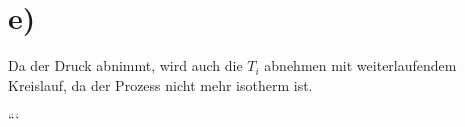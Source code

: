 

\section*{e)}

Da der Druck abnimmt, wird auch die $T_i$ abnehmen mit weiterlaufendem Kreislauf, da der Prozess nicht mehr isotherm ist.

```